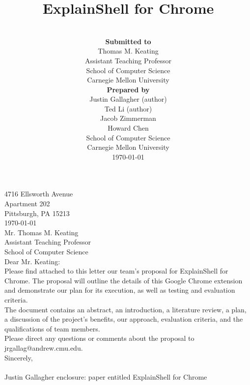 \documentclass[11pt]{article}
\title{ExplainShell for Chrome \\ \vspace*{.5em} \Large\mytitle}
\date{}
\begin{document}
\clearpage
{}
\thispagestyle{zerostyle}
4716 Ellsworth Avenue\\
Apartment 202\\
Pittsburgh, PA 15213\\

\today\\

Mr. Thomas M. Keating\\
Assistant Teaching Professor\\
School of Computer Science\\

Dear Mr. Keating:\\

Please find attached to this letter our team's proposal for ExplainShell for Chrome. The proposal will outline the details of this Google Chrome extension and demonstrate our plan for its execution, as well as testing and evaluation criteria.\\

The document contains an abstract, an introduction, a literature review, a plan, a discussion of the project's benefits, our approach, evaluation criteria, and the qualifications of team members.\\

Please direct any questions or comments about the proposal to jrgallag@andrew.cmu.edu.\\

Sincerely,\\

~\\

Justin Gallagher
\vfill
enclosure: paper entitled ExplainShell for Chrome
\newpage

\author{~\\
\normalsize {\bf Submitted to}\\
\normalsize Thomas M. Keating\\
\normalsize Assistant Teaching Professor\\
\normalsize School of Computer Science\\
\normalsize Carnegie Mellon University\vspace*{2em}\\
\normalsize {\bf Prepared by}\\
\normalsize Justin Gallagher (author)\\
\normalsize Ted Li (author)\\
\normalsize Jacob Zimmerman\\
\normalsize Howard Chen\vspace*{2em}\\
\normalsize School of Computer Science\\
\normalsize Carnegie Mellon University\\
\normalsize \today}
\end{document}
